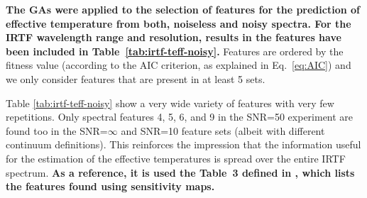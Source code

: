 \textbf{
The GAs were applied to the selection of features for the
prediction of effective temperature from both, noiseless and noisy spectra.
For the IRTF wavelength range and resolution, results in the features have been included
in Table~\ref{tab:irtf-teff-noisy}. 
}
Features are ordered by the
fitness value (according to the AIC criterion, as explained in Eq.~\ref{eq:AIC}) and 
we only consider features that are present in at least 5 sets.


Table %
\ref{tab:irtf-teff-noisy}
show a very wide variety of features with very few repetitions. Only
spectral features 4, 5, 6, and 9 in the SNR=50 experiment are found
too in the SNR=$\infty$ and SNR=10 feature sets (albeit with different
continuum definitions). This reinforces the impression that the
information useful for the estimation of the effective temperatures is
spread over the entire IRTF spectrum.
\textbf{
As a reference, it is used the Table~3 defined in \cite{cesetti}, which
lists the features found using sensitivity maps.
}


